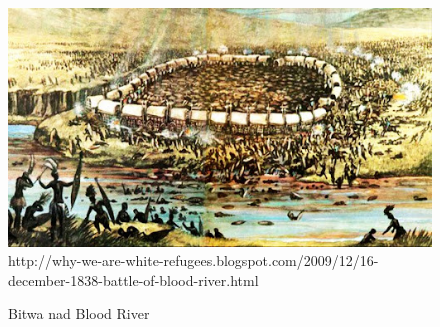 \documentclass[12pt, twocolumn]{article}
\begin{document}
\begin{figure}[p]%
\caption{Bitwa nad Blood River}
\includegraphics[scale=.8]{blood River.jpg}
\tiny{http://why-we-are-white-refugees.blogspot.com/2009/12/16-december-1838-battle-of-blood-river.html}
\label{fig3}
\end{figure}
\end{document}
